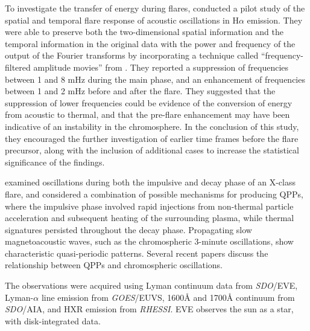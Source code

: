 To investigate the transfer of energy during flares, \cite{Monsue2016}
conducted a pilot study of the spatial and temporal flare response of acoustic
oscillations in H$\alpha$ emission.
They were able to preserve both the two-dimensional spatial information
and the temporal information in the original data
with the power and frequency of the output of the Fourier transforms
by incorporating a technique called ``frequency-filtered amplitude movies''
from \cite{Jackiewicz2013}.
They reported a suppression of frequencies
between 1 and 8 mHz during the main phase, and an enhancement of frequencies
between 1 and 2 mHz before and after the flare. They suggested that the
suppression of lower frequencies could be evidence of the conversion of energy
from acoustic to thermal, and that the pre-flare enhancement may have been
indicative of an instability in the chromosphere.
In the conclusion of this study, they encouraged
the further investigation of
earlier time frames before the flare precursor, along with the
inclusion of additional cases to increase the statistical significance of the
findings.

\cite{Hayes2016} examined oscillations during
both the impulsive and decay phase of an X-class flare, and considered
a combination of possible mechanisms for producing QPPs, where the
impulsive phase involved rapid injections from non-thermal particle
acceleration and subsequent heating of the surrounding plasma, while
thermal signatures persisted throughout the decay phase.
Propagating slow magnetoacoustic waves, such as the chromospheric
3-minute oscillations, show characteristic quasi-periodic patterns.
Several recent papers discuss the relationship between QPPs and
chromospheric oscillations.

The observations were acquired using
Lyman continuum data from \textit{SDO}/EVE,
Lyman-$\alpha$ line emission from \textit{GOES}/EUVS,
1600\AA{} and 1700\AA{} continuum from \textit{SDO}/AIA, and
HXR emission from \textit{RHESSI}.
EVE observes the sun as a star, with disk-integrated data.

